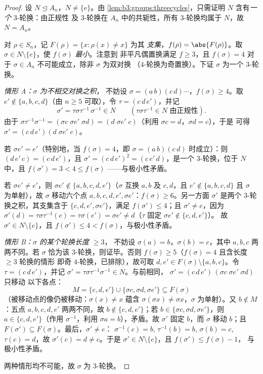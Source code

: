 \begin{proof}
设 $N \trianglelefteq A_n$，$N \neq \{e\}$。由
\cref{lem:b3:groups:threecycles}，只需证明 $N$
含有\emph{一个} $3$-轮换：由正规性
及 $3$-轮换在 $A_n$ 中的共轭性，所有 $3$-轮换均属于 $N$，故 $N = A_n$。

对 $\rho \in S_n$，记 $F(\rho) = \{x : \rho(x) \neq x\}$ 为其
\emph{支集}，$f(\rho) = \abs{F(\rho)}$。取 $\sigma \in N
\setminus \{e\}$，使 $f(\sigma)$ \emph{最小}。注意到
非平凡偶置换满足 $f \geq 3$，且 $f(\sigma) =
4$ 对于 $\sigma \in A_n$ 不可能成立，除非 $\sigma$ 为双对换
（$4$-轮换为奇置换）。下证 $\sigma$ 为一个
$3$-轮换。

\emph{情形 A：$\sigma$ 为不相交对换之积}，
不妨设 $\sigma = (a\,b)(c\,d)\cdots$，$f(\sigma) \geq 4$。取 $e'
\notin \{a, b, c, d\}$（由 $n \geq 5$ 可取），令 $\tau =
(c\,d\,e')$，并记
\[
\sigma' = \tau\sigma\tau^{-1}\,\sigma^{-1} \in N
\qquad (\tau\sigma\tau^{-1} \in N \text{ 由正规性}).
\]
由于 $\sigma\tau^{-1}\sigma^{-1} = (\sigma c\;\sigma e'\;\sigma
d) = (d\;\sigma e'\;c)$（利用 $\sigma c = d$，$\sigma d = c$），于是
可得 $\sigma' = (c\,d\,e')(d\;\sigma e'\;c)$。

若 $\sigma e' = e'$（特别地，当 $f(\sigma) =
4$，即 $\sigma = (a\,b)(c\,d)$ 时成立）：则 $(d\,e'\,c) =
(c\,d\,e')$，且 $\sigma' = (c\,d\,e')^2 = (c\,e'\,d)$，是一个
$3$-轮换，位于 $N$ 中，且 $f(\sigma') = 3 < 4 \leq f(\sigma)$
——与极小性矛盾。

若 $\sigma e' \neq e'$，则 $\sigma e' \notin \{a, b, c, d,
e'\}$（$\sigma$ 互换 $a,b$ 及 $c,d$，且 $e' \notin \{a,b,c,d\}$
且 $\sigma$ 为单射），故 $\sigma$ 移动六个点 $a, b,
c, d, e', \sigma e'$：$f(\sigma) \geq 6$。另一方面
$\sigma'$ 是两个 $3$-轮换之积，其支集含于 $\{c, d,
e', \sigma e'\}$，满足 $f(\sigma') \leq 4$；且 $\sigma' \neq
e$，因为 $\sigma'(d) = \tau\sigma\tau^{-1}(c) = \tau\sigma(e') =
\sigma e' \neq d$（$\tau$ 固定 $\sigma e' \notin \{c,d,e'\}$）。
故 $\sigma' \in N \setminus\{e\}$，且 $f(\sigma') \leq 4 <
f(\sigma)$，与极小性矛盾。

\emph{情形 B：$\sigma$ 的某个轮换长度 $\geq 3$}，
不妨设 $\sigma(a) = b$，$\sigma(b) = c$，其中 $a, b, c$ 两两不同。若
$\sigma$ 恰为该 $3$-轮换，则证毕。否则
$f(\sigma) \geq 5$（$f(\sigma) = 4$ 且含长度 $\geq3$ 轮换的情形
即奇 $4$-轮换，已排除），故可取 $d, e' \in
F(\sigma) \setminus \{a, b, c\}$。令 $\tau = (c\,d\,e')$，并记
$\sigma' = \tau\sigma\tau^{-1}\sigma^{-1} \in N$。与前相同，
$\sigma' = (c\,d\,e')\,(\sigma c\;\sigma e'\;\sigma d)$ 只移动
以下各点：
\[
M = \{c, d, e'\} \cup \{\sigma c, \sigma d, \sigma e'\}
\subseteq F(\sigma)
\]
（被移动点的像仍被移动：$\sigma(x) \ne x$ 蕴含
$\sigma(\sigma x) \neq \sigma x$，$\sigma$ 为单射）。又
$b \notin M$：五点 $a, b, c, d, e'$ 两两不同，故 $b
\notin \{c, d, e'\}$；若 $b \in \{\sigma c, \sigma d, \sigma
e'\}$，则 $a \in \{c, d, e'\}$（作用 $\sigma^{-1}$，利用
$\sigma a = b$），矛盾。故 $\sigma'$ 固定 $b$，而
$\sigma$ 移动 $b$；且
$F(\sigma') \subseteq F(\sigma)$。最后，$\sigma' \neq e$：
$\sigma^{-1}(c) = b$, $\tau^{-1}(b) = b$, $\sigma(b) = c$,
$\tau(c) = d$，故 $\sigma'(c) = d \neq c$。于是 $\sigma' \in N
\setminus \{e\}$，且 $f(\sigma') \leq f(\sigma) - 1$，
与极小性矛盾。

两种情形均不可能，故 $\sigma$ 为 $3$-轮换。
\end{proof}

